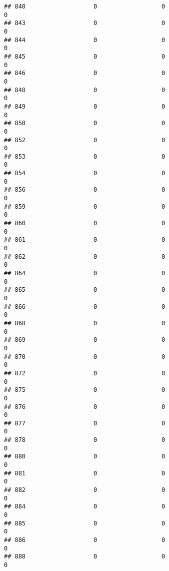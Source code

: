 \documentclass[
]{article}
\begin{document}
\begin{verbatim}
## 840                   0                  0                              0
## 843                   0                  0                              0
## 844                   0                  0                              0
## 845                   0                  0                              0
## 846                   0                  0                              0
## 848                   0                  0                              0
## 849                   0                  0                              0
## 850                   0                  0                              0
## 852                   0                  0                              0
## 853                   0                  0                              0
## 854                   0                  0                              0
## 856                   0                  0                              0
## 859                   0                  0                              0
## 860                   0                  0                              0
## 861                   0                  0                              0
## 862                   0                  0                              0
## 864                   0                  0                              0
## 865                   0                  0                              0
## 866                   0                  0                              0
## 868                   0                  0                              0
## 869                   0                  0                              0
## 870                   0                  0                              0
## 872                   0                  0                              0
## 875                   0                  0                              0
## 876                   0                  0                              0
## 877                   0                  0                              0
## 878                   0                  0                              0
## 880                   0                  0                              0
## 881                   0                  0                              0
## 882                   0                  0                              0
## 884                   0                  0                              0
## 885                   0                  0                              0
## 886                   0                  0                              0
## 888                   0                  0                              0

\end{verbatim}
\end{document}

